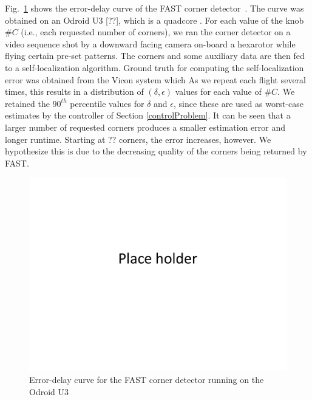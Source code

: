 Fig.~\ref{fig:fast} shows the error-delay curve of the FAST corner detector~\cite{rosten_2006_machine}.
The curve was obtained on an Odroid U3 [??], which is a quadcore .
For each value of the knob $\#C$ (i.e., each requested number of corners), we ran the corner detector on a video sequence shot by a downward facing camera on-board a hexarotor while flying certain pre-set patterns.
The corners and some auxiliary data are then fed to a self-localization algorithm.
Ground truth for computing the self-localization error was obtained from the Vicon system which 
As we repeat each flight several times, this results in a distribution of $(\delta,\epsilon)$ values for each value of $\#C$. 
We retained the $90^{th}$ percentile values for $\delta$ and $\epsilon$, since these are used as worst-case estimates by the controller of Section \ref{controlProblem}.
It can be seen that a larger number of requested corners produces a smaller estimation error and longer runtime.
Starting at ?? corners, the error increases, however.
We hypothesize this is due to the decreasing quality of the corners being returned by FAST.

\begin{figure}[t]
\centering
\includegraphics[width=0.7\linewidth]{figures/placeHolder}
\caption{Error-delay curve for the FAST corner detector running on the Odroid U3}
\label{fig:fast}
\end{figure}

